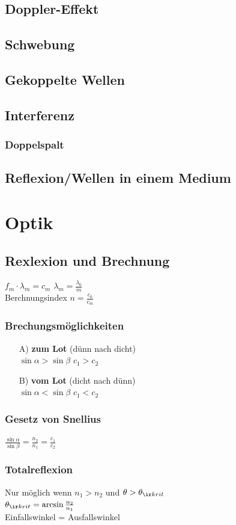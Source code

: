 \documentclass[german]{latex4ei/latex4ei_sheet}
\begin{document}
\subsection{Doppler-Effekt}
\subsection{Schwebung}
\subsection{Gekoppelte Wellen}
\subsection{Interferenz}
\subsubsection{Doppelspalt}
\subsection{Reflexion/Wellen in einem Medium}

\section{Optik}
\begin{sectionbox}
\subsection{Rexlexion und Brechnung}
$f_m \cdot \lambda_m = c_m$ \qquad
$\lambda_m = \frac{\lambda_0}{m}$\\
Berchnungsindex $n=\frac{c_0}{c_m}$
\subsubsection{Brechungsmöglichkeiten}
\begin{enumerate}
\item[A)] \textbf{zum Lot} (dünn nach dicht)\\
$\sin \alpha > \sin \beta$ \qquad $c_1 > c_2$
\item[B)] \textbf{vom Lot} (dicht nach dünn)\\
$\sin \alpha < \sin \beta$ \qquad $c_1 < c_2$
\end{enumerate}
\subsubsection{Gesetz von Snellius}
$\frac{\sin \alpha}{\sin \beta} = \frac{n_2}{n_1} = \frac {c_1}{c_2}$
\subsubsection{Totalreflexion}
Nur möglich wenn $n_1 > n_2$ und $\theta > \theta_{\ir krit}$ \\
$\theta_{\ir krit} = \arcsin \frac{n_2}{n_1}$\\
Einfallswinkel = Ausfallswinkel
\end{sectionbox}
\end{document}
